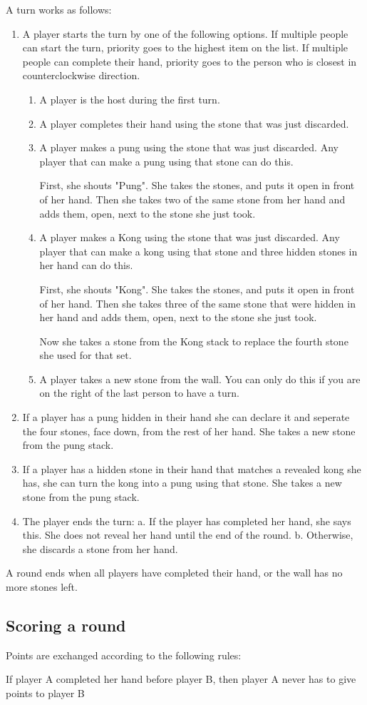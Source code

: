 \documentclass{article}
\begin{document}
A turn works as follows:
\begin{enumerate}
    \item A player starts the turn by one of the following options. If multiple people can start the turn, priority goes to the highest item on the list. If multiple people can complete their hand, priority goes to the person who is closest in counterclockwise direction.
    \begin{enumerate}
        \item A player is the host during the first turn.
        \item A player completes their hand using the stone that was just discarded.
        \item A player makes a pung using the stone that was just discarded. Any player that can make a pung using that stone can do this.

        First, she shouts "Pung". She takes the stones, and puts it open in front of her hand. Then she takes two of the same stone from her hand and adds them, open, next to the stone she just took.
        \item A player makes a Kong using the stone that was just discarded. Any player that can make a kong using that stone and three hidden stones in her hand can do this.

        First, she shouts "Kong". She takes the stones, and puts it open in front of her hand. Then she takes three of the same stone that were hidden in her hand and adds them, open, next to the stone she just took.

        Now she takes a stone from the Kong stack to replace the fourth stone she used for that set.
        \item A player takes a new stone from the wall. You can only do this if you are on the right of the last person to have a turn.
    \end{enumerate}
    \item If a player has a pung hidden in their hand she can declare it and seperate the four stones, face down, from the rest of her hand. She takes a new stone from the pung stack.
    \item If a player has a hidden stone in their hand that matches a revealed kong she has, she can turn the kong into a pung using that stone. She takes a new stone from the pung stack.
    \item The player ends the turn:
   a. If the player has completed her hand, she says this. She does not reveal her hand until the end of the round.
   b. Otherwise, she discards a stone from her hand.
\end{enumerate}

A round ends when all players have completed their hand, or the wall has no more stones left.

\subsection{Scoring a round}
Points are exchanged according to the following rules:

If player A completed her hand before player B, then player A never has to give points to player B
\end{document}
